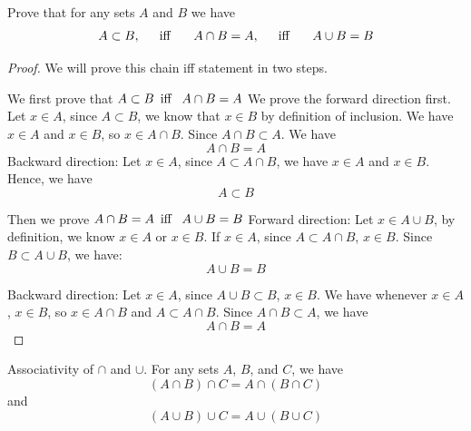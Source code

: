 \begin{minorEx}%
    Prove that for any sets $A$ and $B$ we have 
    $$
    A \subset B, \hspace{15pt} \text{\normalfont iff } \hspace{15pt} A \cap B =
    A, \hspace{15pt} \text{\normalfont iff } \hspace{15pt} A \cup B = B
    $$
\end{minorEx}

\begin{proof}
    We will prove this chain iff statement in two steps.

    We first prove that $A \subset B \hspace{5pt} \text{\normalfont iff }
    \hspace{5pt} A \cap B = A$ We prove the forward direction first.  Let $x \in
    A$, since $A \subset B$, we know that $x \in B$ by definition of inclusion.
    We have $x \in A$ and $x \in B$, so $x \in A \cap B$. Since $A \cap B
    \subset A$. We have $$A \cap B = A$$ Backward direction: Let $x \in A$,
    since $A \subset A \cap B$, we have $x \in A$ and $x \in B$. Hence, we have
    $$A \subset B$$

    Then we prove $A \cap B = A \hspace{5pt} \text{\normalfont iff }
    \hspace{5pt} A \cup B = B$ Forward direction: Let $x \in A \cup B$, by
    definition, we know $x \in A$ or $x \in B$. If $x \in A$, since $A \subset A
    \cap B$, $x \in B$. Since $B \subset A \cup B$, we have: $$A \cup B = B$$

    Backward direction: Let $x \in A$, since $A \cup B \subset B$, $x \in B$. We
    have whenever $x \in A$, $x \in B$, so $x \in A \cap B$ and $A \subset A
    \cap B$. Since $A \cap B \subset A$, we have $$A \cap B = A$$
\end{proof}            

\begin{majorEx}%
    Associativity of $\cap$ and $\cup$. For any sets $A$, $B$, and $C$, we have
    $$(A \cap B) \cap C = A \cap (B \cap C)$$  and $$(A \cup B) \cup C = A \cup
    (B \cup C)$$
\end{majorEx}

